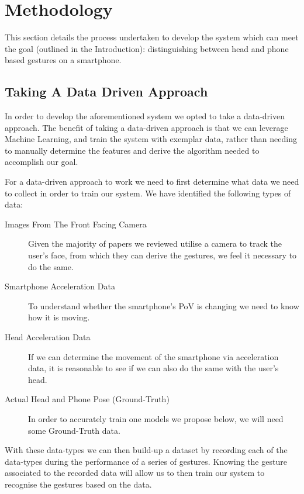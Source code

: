 \section{Methodology} %


This section details the process undertaken to develop the system which can meet the goal (outlined in the Introduction): distinguishing between head and phone based gestures on a smartphone.

\subsection{Taking A Data Driven Approach}
In order to develop the aforementioned system we opted to take a data-driven approach. The benefit of taking a data-driven approach is that we can leverage Machine Learning, and train the system with exemplar data, rather than needing to manually determine the features and derive the algorithm needed to accomplish our goal.

For a data-driven approach to work we need to first determine what data we need to collect in order to train our system. We have identified the following types of data:
\begin{description}
    \item[Images From The Front Facing Camera]\nl Given the majority of papers we reviewed  utilise a camera to track the user's face, from which they can derive the gestures, we feel it necessary to do the same.
    \item[Smartphone Acceleration Data]\nl To understand whether the smartphone's PoV is changing we need to know how it is moving. 
    \item[Head Acceleration Data]\nl If we can determine the movement of the smartphone via acceleration data, it is reasonable to see if we can also do the same with the user's head.
    \item[Actual Head and Phone Pose (Ground-Truth)]\nl In order to accurately train one models we propose below, we will need some Ground-Truth data.
\end{description}

With these data-types we can then build-up a dataset by recording each of the data-types during the performance of a series of gestures. Knowing the gesture associated to the recorded data will allow us to then train our system to recognise the gestures based on the data.

